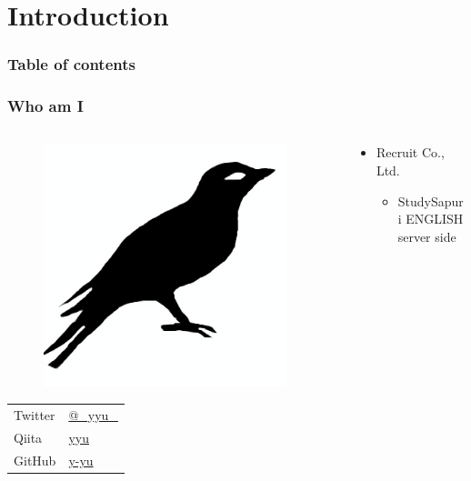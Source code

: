\section{Introduction}

\begin{frame}
  \frametitle{Table of contents}

  \tableofcontents
\end{frame}

\begin{frame}
  \frametitle{Who am I}
  
  \begin{columns}
    \begin{column}{0.3\textwidth}
      \begin{center}
        \begin{figure}
          \includegraphics[width=0.95\textwidth]{img/bird2x.png}
        \end{figure}
      \end{center}
 
      \begin{table}[h]
        \begin{tabular}{ll}
          Twitter & \href{https://twitter.com/\_yyu\_}{@\_yyu\_} \\
          Qiita &  \href{https://qiita.com/yyu}{yyu} \\
          GitHub &  \href{https://github.com/y-yu}{y-yu} \\
        \end{tabular}
      \end{table}
    \end{column}
    \begin{column}{0.7\textwidth}
      \begin{itemize}
        \item Recruit Co., Ltd.
        \begin{itemize}
          \item StudySapuri ENGLISH server side
        \end{itemize}


\end{itemize}
\end{column}
\end{columns}
\end{frame}
